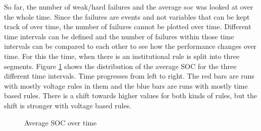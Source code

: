 \documentclass[a4paper]{article}
\begin{document}
So far, the number of weak/hard failures and the average soc was looked at over the whole time. 
Since the failures are events and not variables that can be kept track of over time, the number of failures cannot be plotted over time. 
Different time intervals can be defined and the number of failures within those time intervals can be compared to each other to 
see how the performance changes over time. For this the time, when there is an institutional rule is split into three segments. 
Figure \ref{average_over_time} shows the distribution of the average SOC for the three different time intervals.
Time progresses from left to right. 
The red bars are runs with mostly voltage rules in them and the blue bars are runs with mostly time based rules.
There is a shift towards higher values for both kinds of rules, but the shift is stronger with voltage based rules. 
\begin{figure}[!ht]
\caption{Average SOC over time}
\label{average_over_time}
\end{figure}
\end{document}
